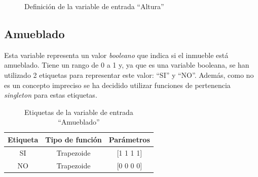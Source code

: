 \documentclass[12pt]{report} %
\begin{document}
        \begin{figure}[H]
            \centering
            \caption{Definición de la variable de entrada ``Altura''}
        \end{figure}

        \subsection{Amueblado}
        Esta variable representa un valor \textit{booleano} que indica si el inmueble está amueblado.
        Tiene un rango de 0 a 1 y, ya que es una variable booleana, se han utilizado 2 etiquetas para representar este valor: ``SI'' y ``NO''.
        Además, como no es un concepto impreciso se ha decidido utilizar funciones de pertenencia \textit{singleton} para estas etiquetas.

        \begin{table}[h]
            \center
            \begin{tabular}{@{}ccc@{}}
                \toprule
                \textbf{Etiqueta} & \textbf{Tipo de función} & \textbf{Parámetros} \\
                \midrule
                SI & Trapezoide & [1 1 1 1] \\
                NO & Trapezoide & [0 0 0 0] \\
                \bottomrule
            \end{tabular}
            \caption{Etiquetas de la variable de entrada ``Amueblado''}
        \end{table}
\end{document}
